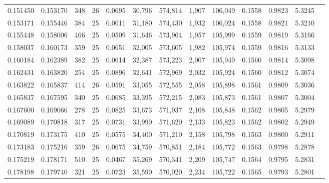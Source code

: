 \begin{tabular}{rrrrrrrrrrrrr}
0.151450 & 0.153170 &   348 &  26 &                                     0.0695 &  30,796 & 574,814 &   1,907 & 106,049 & 0.1558 & 0.9823 & 5.3245 \\
0.153171 & 0.155446 &   384 &  25 &                                     0.0611 &  31,180 & 574,430 &   1,932 & 106,024 & 0.1558 & 0.9821 & 5.3210 \\
0.155448 & 0.158006 &   466 &  25 &                                     0.0509 &  31,646 & 573,964 &   1,957 & 105,999 & 0.1559 & 0.9819 & 5.3166 \\
0.158037 & 0.160173 &   359 &  25 &                                     0.0651 &  32,005 & 573,605 &   1,982 & 105,974 & 0.1559 & 0.9816 & 5.3133 \\
0.160184 & 0.162389 &   382 &  25 &                                     0.0614 &  32,387 & 573,223 &   2,007 & 105,949 & 0.1560 & 0.9814 & 5.3098 \\
0.162431 & 0.163820 &   254 &  25 &                                     0.0896 &  32,641 & 572,969 &   2,032 & 105,924 & 0.1560 & 0.9812 & 5.3074 \\
0.163822 & 0.165837 &   414 &  26 &                                     0.0591 &  33,055 & 572,555 &   2,058 & 105,898 & 0.1561 & 0.9809 & 5.3036 \\
0.165837 & 0.167595 &   340 &  25 &                                     0.0685 &  33,395 & 572,215 &   2,083 & 105,873 & 0.1561 & 0.9807 & 5.3004 \\
0.167600 & 0.169066 &   278 &  25 &                                     0.0825 &  33,673 & 571,937 &   2,108 & 105,848 & 0.1562 & 0.9805 & 5.2979 \\
0.169089 & 0.170818 &   317 &  25 &                                     0.0731 &  33,990 & 571,620 &   2,133 & 105,823 & 0.1562 & 0.9802 & 5.2949 \\
0.170819 & 0.173175 &   410 &  25 &                                     0.0575 &  34,400 & 571,210 &   2,158 & 105,798 & 0.1563 & 0.9800 & 5.2911 \\
0.173183 & 0.175216 &   359 &  26 &                                     0.0675 &  34,759 & 570,851 &   2,184 & 105,772 & 0.1563 & 0.9798 & 5.2878 \\
0.175219 & 0.178171 &   510 &  25 &                                     0.0467 &  35,269 & 570,341 &   2,209 & 105,747 & 0.1564 & 0.9795 & 5.2831 \\
0.178198 & 0.179740 &   321 &  25 &                                     0.0723 &  35,590 & 570,020 &   2,234 & 105,722 & 0.1565 & 0.9793 & 5.2801 \\

\end{tabular}
